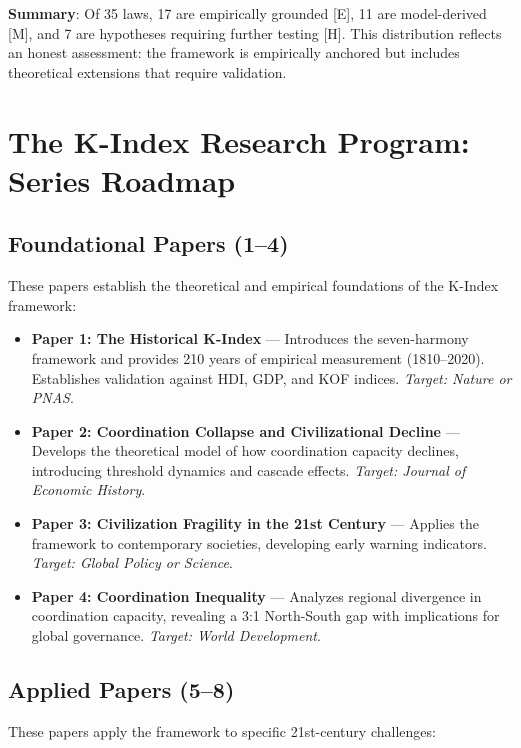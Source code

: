 \documentclass[12pt,letterpaper]{article}
\begin{document}
\textbf{Summary}: Of 35 laws, 17 are empirically grounded [E], 11 are model-derived [M], and 7 are hypotheses requiring further testing [H]. This distribution reflects an honest assessment: the framework is empirically anchored but includes theoretical extensions that require validation.

\section{The K-Index Research Program: Series Roadmap}

\subsection{Foundational Papers (1--4)}

These papers establish the theoretical and empirical foundations of the K-Index framework:

\begin{itemize}
    \item \textbf{Paper 1: The Historical K-Index} --- Introduces the seven-harmony framework and provides 210 years of empirical measurement (1810--2020). Establishes validation against HDI, GDP, and KOF indices. \textit{Target: Nature or PNAS}.

    \item \textbf{Paper 2: Coordination Collapse and Civilizational Decline} --- Develops the theoretical model of how coordination capacity declines, introducing threshold dynamics and cascade effects. \textit{Target: Journal of Economic History}.

    \item \textbf{Paper 3: Civilization Fragility in the 21st Century} --- Applies the framework to contemporary societies, developing early warning indicators. \textit{Target: Global Policy or Science}.

    \item \textbf{Paper 4: Coordination Inequality} --- Analyzes regional divergence in coordination capacity, revealing a 3:1 North-South gap with implications for global governance. \textit{Target: World Development}.
\end{itemize}

\subsection{Applied Papers (5--8)}

These papers apply the framework to specific 21st-century challenges:
\end{document}
